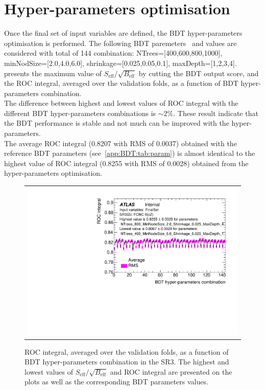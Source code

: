 \section{Hyper-parameters optimisation}
Once the final set of input variables are defined, the BDT hyper-parameters optimisation is performed.
The following BDT paremeters~\cite{TMVA} and values are considered with total of 144 combination:
NTrees=[400,600,800,1000], minNodSize=[2.0,4.0,6.0], shrinkage=[0.025,0.05,0.1], maxDepth=[1,2,3,4].
~ presents the maximum value of $S_{\text{eff}}/\sqrt{B_{\text{eff}}}$ by cutting the BDT output score, and the ROC integral,
averaged over the validation folds, as a function of BDT hyper-parameters combination.\\
The difference between highest and lowest values of ROC integral
with the different BDT hyper-parameters combinations is $\sim2\%$.
These result indicate that the BDT performance is stable and not much can be improved with the hyper-parameters.\\
The average ROC integral (0.8207 with RMS of 0.0037) obtained with the reference BDT parameters (see~\cref{app:BDT:tab:param}) is almost identical to the highest value of ROC integral (0.8255 with RMS of 0.0028) obtained from the hyper-parameters optimisation.

\begin{figure}[!htbp]
	\centering
	\begin{tabular}{c}
		\includegraphics[width=.6\textwidth]{Chapters/CH5/figures/SR3_UsingSMT/BDT/FinalSet/HPO/ROC_integral}
	\end{tabular}
	\caption{ROC integral, averaged over the validation folds,
		as a function of BDT hyper-parameters combination in the SR3. The highest and lowest values of $S_{\text{eff}}/\sqrt{B_{\text{eff}}}$ and ROC integral are presented on the plots as well as
		the corresponding BDT parameters values.}
	\label{app:BDT:fig:SR3:HPO}
\end{figure}


